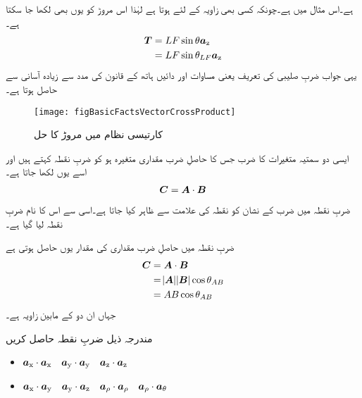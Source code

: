 ہے۔اس مثال میں  ہے۔چونکہ کسی بھی زاویہ    کے لئے  ہوتا ہے لہٰذا اس مروڑ کو یوں بھی لکھا جا سکتا ہے۔
\begin{align*}
{\ensuremath{{\boldsymbol{T}}}}&=LF\sin \theta {\boldsymbol{a}}_{\textup{z}}\\
&=L F \sin \theta_{LF}{\boldsymbol{a}}_{\textup{z}}
\end{align*}
یہی جواب ضربِ صلیبی کی تعریف یعنی مساوات اور دائیں ہاتھ کے قانون کی مدد سے زیادہ آسانی سے حاصل ہوتا ہے۔
%
\begin{figure}
\centering
\texttt{[image: figBasicFactsVectorCrossProduct]}
\caption{کارتیسی نظام میں مروڑ کا حل}
\label{شکل_حقائق_کارتیسی_مروڑ_کا_حل}
\end{figure}
%
ایسی دو سمتیہ متغیرات کا ضرب جس کا حاصلِ ضرب مقداری متغیرہ ہو کو ضربِ نقطہ کہتے ہیں اور اسے یوں لکھا جاتا ہے۔
\begin{align}
{\ensuremath{{\boldsymbol{C}}}}={{\boldsymbol{A}}} \cdot {\ensuremath{{\boldsymbol{B}}}}
\end{align}
ضربِ نقطہ میں ضرب کے نشان کو نقطہ کی علامت سے ظاہر کیا جاتا ہے۔اسی سے اس کا نام ضربِ نقطہ لیا گیا ہے۔

ضربِ نقطہ میں حاصلِ ضرب مقداری کی مقدار یوں حاصل ہوتی ہے
\begin{gather}
\begin{aligned}
{\ensuremath{{\boldsymbol{C}}}}&={{\boldsymbol{A}}} \cdot {\ensuremath{{\boldsymbol{B}}}}\\
&=\abs{{{\boldsymbol{A}}}} \abs{{{\boldsymbol{B}}}} \cos \theta_{AB}\\
&=A B \cos \theta_{AB}
\end{aligned}
\end{gather}
جہاں  ان دو کے مابین زاویہ ہے۔

مندرجہ ذیل ضربِ نقطہ حاصل کریں
\begin{itemize}
\item
${\boldsymbol{a}}_{\textup{x}} \cdot {\boldsymbol{a}}_{\textup{x}} \quad {\boldsymbol{a}}_{\textup{y}} \cdot {\boldsymbol{a}}_{\textup{y}} \quad {\boldsymbol{a}}_{\textup{z}} \cdot {\boldsymbol{a}}_{\textup{z}}$\\
\item
${\boldsymbol{a}}_{\textup{x}} \cdot {\boldsymbol{a}}_{\textup{y}} \quad {\boldsymbol{a}}_{\textup{y}} \cdot {\boldsymbol{a}}_{\textup{z}} \quad {\boldsymbol{a}}_{\rho} \cdot {\boldsymbol{a}}_{\rho} \quad {\boldsymbol{a}}_{\rho} \cdot {\boldsymbol{a}}_{\theta}$
\end{itemize}

